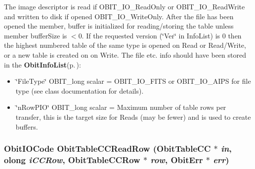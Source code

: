 The image descriptor is read if OBIT\_\-IO\_\-Read\-Only or OBIT\_\-IO\_\-Read\-Write and written to disk if opened OBIT\_\-IO\_\-Write\-Only. After the file has been opened the member, buffer is initialized for reading/storing the table unless member buffer\-Size is $<$0. If the requested version (\char`\"{}Ver\char`\"{} in Info\-List) is 0 then the highest numbered table of the same type is opened on Read or Read/Write, or a new table is created on on Write. The file etc. info should have been stored in the {\bf Obit\-Info\-List}{\rm (p.\,\pageref{structObitInfoList})}: \begin{itemize}
\item \char`\"{}File\-Type\char`\"{} OBIT\_\-long scalar = OBIT\_\-IO\_\-FITS or OBIT\_\-IO\_\-AIPS for file type (see class documentation for details). \item \char`\"{}n\-Row\-PIO\char`\"{} OBIT\_\-long scalar = Maximum number of table rows per transfer, this is the target size for Reads (may be fewer) and is used to create buffers. 
\end{itemize}
\subsubsection{\setlength{\rightskip}{0pt plus 5cm}Obit\-IOCode Obit\-Table\-CCRead\-Row ({\bf Obit\-Table\-CC} $\ast$ {\em in}, {\bf olong} {\em i\-CCRow}, {\bf Obit\-Table\-CCRow} $\ast$ {\em row}, {\bf Obit\-Err} $\ast$ {\em err})}\label{ObitTableCC_8c_a22}


